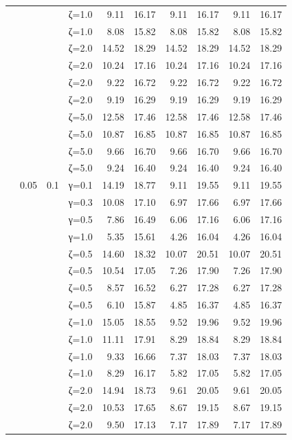 \begin{table}[htbp]
\begin{tabular}{ll r l  rr  rr  rr}
  &  &  & ζ=1.0 & 9.11 & 16.17 & 9.11 & 16.17 & 9.11 & 16.17 \\
  &  &  & ζ=1.0 & 8.08 & 15.82 & 8.08 & 15.82 & 8.08 & 15.82 \\
  &  &  & ζ=2.0 & 14.52 & 18.29 & 14.52 & 18.29 & 14.52 & 18.29 \\
  &  &  & ζ=2.0 & 10.24 & 17.16 & 10.24 & 17.16 & 10.24 & 17.16 \\
  &  &  & ζ=2.0 & 9.22 & 16.72 & 9.22 & 16.72 & 9.22 & 16.72 \\
  &  &  & ζ=2.0 & 9.19 & 16.29 & 9.19 & 16.29 & 9.19 & 16.29 \\
  &  &  & ζ=5.0 & 12.58 & 17.46 & 12.58 & 17.46 & 12.58 & 17.46 \\
  &  &  & ζ=5.0 & 10.87 & 16.85 & 10.87 & 16.85 & 10.87 & 16.85 \\
  &  &  & ζ=5.0 & 9.66 & 16.70 & 9.66 & 16.70 & 9.66 & 16.70 \\
  &  &  & ζ=5.0 & 9.24 & 16.40 & 9.24 & 16.40 & 9.24 & 16.40 \\
  & 0.05 & 0.1 & γ=0.1 & 14.19 & 18.77 & 9.11 & 19.55 & 9.11 & 19.55 \\
  &  &  & γ=0.3 & 10.08 & 17.10 & 6.97 & 17.66 & 6.97 & 17.66 \\
  &  &  & γ=0.5 & 7.86 & 16.49 & 6.06 & 17.16 & 6.06 & 17.16 \\
  &  &  & γ=1.0 & 5.35 & 15.61 & 4.26 & 16.04 & 4.26 & 16.04 \\
  &  &  & ζ=0.5 & 14.60 & 18.32 & 10.07 & 20.51 & 10.07 & 20.51 \\
  &  &  & ζ=0.5 & 10.54 & 17.05 & 7.26 & 17.90 & 7.26 & 17.90 \\
  &  &  & ζ=0.5 & 8.57 & 16.52 & 6.27 & 17.28 & 6.27 & 17.28 \\
  &  &  & ζ=0.5 & 6.10 & 15.87 & 4.85 & 16.37 & 4.85 & 16.37 \\
  &  &  & ζ=1.0 & 15.05 & 18.55 & 9.52 & 19.96 & 9.52 & 19.96 \\
  &  &  & ζ=1.0 & 11.11 & 17.91 & 8.29 & 18.84 & 8.29 & 18.84 \\
  &  &  & ζ=1.0 & 9.33 & 16.66 & 7.37 & 18.03 & 7.37 & 18.03 \\
  &  &  & ζ=1.0 & 8.29 & 16.17 & 5.82 & 17.05 & 5.82 & 17.05 \\
  &  &  & ζ=2.0 & 14.94 & 18.73 & 9.61 & 20.05 & 9.61 & 20.05 \\
  &  &  & ζ=2.0 & 10.53 & 17.65 & 8.67 & 19.15 & 8.67 & 19.15 \\
  &  &  & ζ=2.0 & 9.50 & 17.13 & 7.17 & 17.89 & 7.17 & 17.89 \\

\end{tabular}
\end{table}
